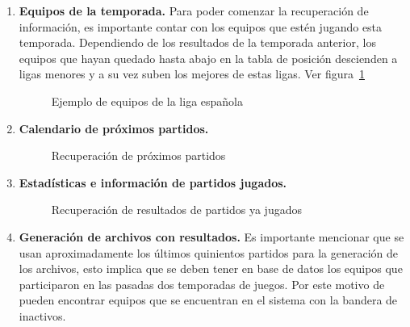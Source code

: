 \begin{enumerate}
	\item \textbf{Equipos de la temporada.}
	Para poder comenzar la recuperación de información, es importante contar con los equipos que estén jugando esta temporada. Dependiendo de los resultados de la temporada anterior, los equipos que hayan quedado hasta abajo en la tabla de posición descienden a ligas menores y a su vez suben los mejores de estas ligas. Ver figura~\ref{Fig:los-equipos}
	\begin{figure}[!htb]\centering
	   \begin {minipage}{1\textwidth}
	     \caption[Ejemplo de equipos de la liga española]{Ejemplo de equipos de la liga española\footnotemark }\label{Fig:los-equipos}
	   \end{minipage}
	\end{figure}

	
	\item \textbf{Calendario de próximos partidos.}
	\begin{figure}[!htb]\centering
	   \begin {minipage}{1\textwidth}
	     \caption{Recuperación de próximos partidos}\label{Fig:proximos-partidos}
	   \end{minipage}
	\end{figure}
	
	\item \textbf{Estadísticas e información de partidos jugados.}
	\begin{figure}[!htb]\centering
	   \begin {minipage}{1\textwidth}
	     \caption{Recuperación de resultados de partidos ya jugados}\label{Fig:pasados-partidos}
	   \end{minipage}
	\end{figure}
	\item \textbf{Generación de archivos con resultados.}
	Es importante mencionar que se usan aproximadamente los últimos quinientos partidos para la generación de los archivos, esto implica que se deben tener en base de datos los equipos que participaron en las pasadas dos temporadas de juegos. Por este motivo de pueden encontrar equipos que se encuentran en el sistema con la bandera de inactivos.
	
\end{enumerate}













